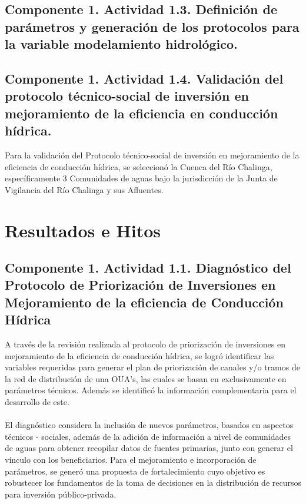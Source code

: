 \documentclass[]{article}
\begin{document}
\subsection{Componente 1. Actividad 1.3. Definición de parámetros y generación de los protocolos para la variable modelamiento hidrológico.}



\subsection{Componente 1. Actividad 1.4. Validación del protocolo técnico-social de inversión en mejoramiento de la eficiencia en conducción hídrica.}

Para la validación del Protocolo técnico-social de inversión en mejoramiento de la eficiencia de conducción hídrica, se seleccionó la Cuenca del Río Chalinga, específicamente 3 Comunidades de aguas bajo la jurisdicción de la Junta de Vigilancia del Río Chalinga y sus Afluentes. 

\clearpage
\section{Resultados e Hitos}

\subsection{Componente 1. Actividad 1.1. Diagnóstico del Protocolo de Priorización de Inversiones en Mejoramiento de la eficiencia de Conducción Hídrica}

A través de la revisión realizada al protocolo de priorización de inversiones en mejoramiento de la eficiencia de conducción hídrica, se logró identificar las variables requeridas para generar el plan de priorización de canales y/o tramos de la red de distribución de una OUA's, las cuales se basan en exclusivamente en parámetros técnicos. Además se identificó la información complementaria para el desarrollo de este.\\
\\
El diagnóstico considera la inclusión de nuevos parámetros, basados en aspectos técnicos - sociales, además de la adición de información a nivel de comunidades de aguas para obtener recopilar datos de fuentes primarias, junto con generar el vínculo con los beneficiarios. Para el mejoramiento e incorporación de parámetros, se generó una propuesta de fortalecimiento cuyo objetivo es robustecer los fundamentos de la toma de decisiones en la distribución de recursos para inversión público-privada.
\end{document}
